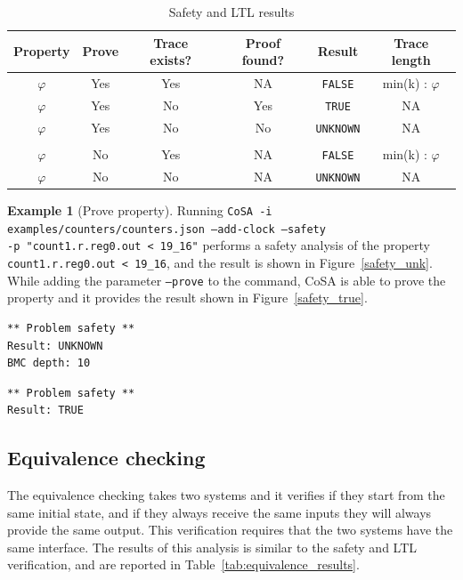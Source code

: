 \documentclass{article}
\theoremstyle{definition}
\newtheorem{example}{Example}[section]
\begin{document}
\begin{table}[h]
  \centering
\begin{tabular}{ c c c c | c c }
  Property & Prove & Trace exists? & Proof found? & Result & Trace length \\ \hline
  $\varphi$ & Yes & Yes & NA & \texttt{FALSE} & min(k) : $\varphi$  \\
  $\varphi$ & Yes & No & Yes & \texttt{TRUE} & NA  \\
  $\varphi$ & Yes & No & No & \texttt{UNKNOWN} & NA  \\ \\
  $\varphi$ & No & Yes & NA & \texttt{FALSE} & min(k) : $\varphi$  \\
  $\varphi$ & No & No & NA & \texttt{UNKNOWN} & NA  \\
\end{tabular}
\caption{Safety and LTL results}
\label{tab:safety_results}
\end{table}

\begin{example}[Prove property]
  Running \texttt{CoSA -i examples/counters/counters.json --add-clock
    --safety\\ -p "count1.r.reg0.out < 19\_16"} performs a safety
  analysis of the property \texttt{count1.r.reg0.out < 19\_16}, and
  the result is shown in Figure~\ref{safety_unk}. While adding the
  parameter \texttt{--prove} to the command, CoSA is able to prove the
  property and it provides the result shown in Figure~\ref{safety_true}.

\begin{lstlisting}[frame=single,language=ets,caption=Safety example (UNKNOWN),label=safety_unk]
** Problem safety **
Result: UNKNOWN
BMC depth: 10
\end{lstlisting}

\begin{lstlisting}[frame=single,language=ets,caption=Safety example (TRUE),label=safety_true]
** Problem safety **
Result: TRUE
\end{lstlisting}

\end{example}


\subsection{Equivalence checking}
\label{sec:equivalence_checking}

The equivalence checking takes two systems and it verifies if they
start from the same initial state, and if they always receive the same
inputs they will always provide the same output. This verification
requires that the two systems have the same interface. The results of
this analysis is similar to the safety and LTL verification, and are
reported in Table~\ref{tab:equivalence_results}.
\end{document}
